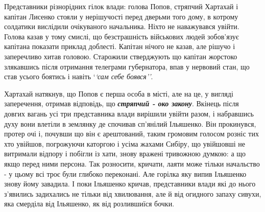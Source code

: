\documentclass[a4paper,20pt]{report}
\begin{document}
Представники різнорідних гілок влади: голова Попов, стряпчий Хартахай і капітан Лисенко стояли у нерішучості
перед дверьми того дому, в котрому солдатики вислідили очікуваного начальника. Ніхто не наважувався увійти.
Голова казав у тому смислі, що безстрашність військових людей зобов'язує капітана 
показати приклад доблесті. Капітан нічого не казав, але рішучо і заперечливо хитав головою. Старожили 
стверджують що капітан жорстоко злякавшись після отримання телеграми губернатора, впав у нервовий стан,
що став усього боятись і навіть `\emph{`сам себе боявся''}.

Хартахай натякнув, що Попов є перша особа в місті, але на це, у вигляді
заперечення, отримав відповідь, що \textbf{\emph{стряпчий - око закону}}.
Вкінець після довгих вагань усі три представника влади вирішили увійти разом, і
набравшись духу вони влетіли в землянку де спочивав сп'янілий Ільяшенко. Він
прокинувся, протер очі і, почувши що він є арештований, таким громовим голосом
розніс тих хто увійшов, погрожуючи каторгою і усіма жахами Сибіру, що увійшовші
не витримали відпору і побігли із хати, знову вражені тривожною думкою: а що
якщо перед ними персона. Так розносити, кричати, лаяти може тільки начальство -
у цьому всі троє були глибоко переконані. Але горілка яку випив Ільяшенко знову
йому завадила. І поки Ільяшенко кричав, представники влади які до нього
з'явились задихались не тільки від хвилювання, але й від огидного запаху
сивухи, яка смерділа від Ільяшенко, як від розлившиїся бочки.
\end{document}
